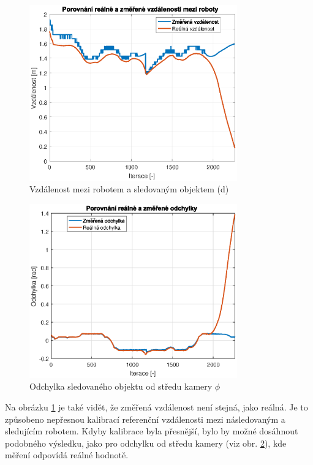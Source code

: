 \documentclass[twoside]{ctuthesis}
\theoremstyle{plain}
\theoremstyle{definition}
\theoremstyle{note}
\begin{document}
\begin{figure}[H]
	\caption{Vzdálenost mezi robotem a sledovaným objektem (d)}

	\label{dist}
	\includegraphics[width=0.8\textwidth]{images/5/dist.eps}
\end{figure}


\begin{figure}[hbt]
	\caption{Odchylka sledovaného objektu od středu kamery $\phi$}

	\label{odch}
	\includegraphics[width=0.8\textwidth]{images/5/odchylka.eps}
\end{figure}
Na obrázku \ref{dist} je také vidět, že změřená vzdálenost není stejná, jako reálná. Je to způsobeno nepřesnou kalibrací referenční vzdálenosti mezi následovaným a sledujícím robotem. Kdyby kalibrace byla přesnější, bylo by možné dosáhnout podobného výsledku, jako pro odchylku od středu kamery (viz obr. \ref{odch}), kde měření odpovídá reálné hodnotě.
\end{document}
